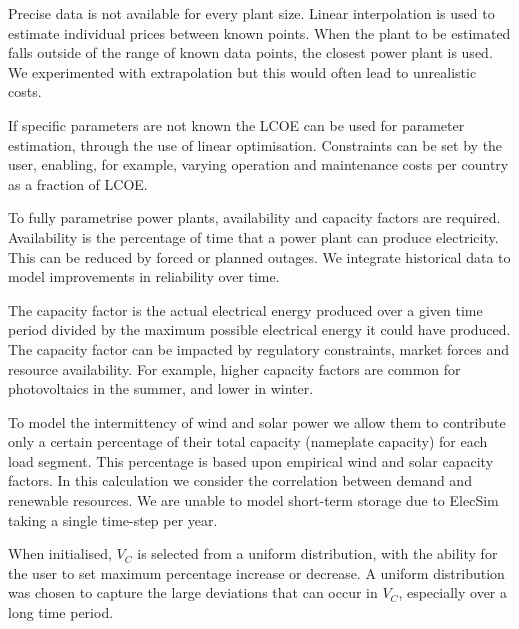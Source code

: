 Precise data is not available for every plant size. Linear interpolation is used to estimate individual prices between known points. When the plant to be estimated falls outside of the range of known data points, the closest power plant is used. We experimented with extrapolation but this would often lead to unrealistic costs. %

If specific parameters are not known the LCOE can be used for parameter estimation, through the use of linear optimisation. Constraints can be set by the user, enabling, for example, varying operation and maintenance costs per country as a fraction of LCOE.

To fully parametrise power plants, availability and capacity factors are required. Availability is the percentage of time that a power plant can produce electricity. This can be reduced by forced or planned outages. We integrate historical data to model improvements in reliability over time.

The capacity factor is the actual electrical energy produced over a given time period divided by the maximum possible electrical energy it could have produced. The capacity factor can be impacted by regulatory constraints, market forces and resource availability. For example, higher capacity factors are common for photovoltaics in the summer, and lower in winter. 

To model the intermittency of wind and solar power we allow them to contribute only a certain percentage of their total capacity (nameplate capacity) for each load segment. This percentage is based upon empirical wind and solar capacity factors. In this calculation we consider the correlation between demand and renewable resources. We are unable to model short-term storage due to ElecSim taking a single time-step per year. 

When initialised, $V_C$ is selected from a uniform distribution, with the ability for the user to set maximum percentage increase or decrease. A uniform distribution was chosen to capture the large deviations that can occur in $V_C$, especially over a long time period. \vphantom{By doing this, the variance in costs between individual power plants for processes such as preventative and corrective maintenance, labour costs and skill, health and safety and chance are different per plant instant.}


